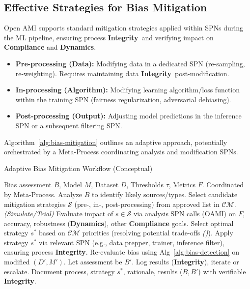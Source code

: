 \documentclass[12pt,a4paper]{report}
\renewcommand{\citep}[1]{\textit{\scriptsize{(\cite{#1})}}}
\newcommand{\Integrity}{\textbf{Integrity}}
\newcommand{\Dynamics}{\textbf{Dynamics}}
\begin{document}
	\subsection{Effective Strategies for Bias Mitigation} %
	\label{sec:5-4-3} %
	
	Open AMI supports standard mitigation strategies applied within SPNs during the ML pipeline, ensuring process \Integrity\ and verifying impact on \textbf{Compliance} and \Dynamics.
	\begin{itemize}
		\item \textbf{Pre-processing (Data):} Modifying data in a dedicated SPN (re-sampling, re-weighting). Requires maintaining data \Integrity\ post-modification.
		\item \textbf{In-processing (Algorithm):} Modifying learning algorithm/loss function within the training SPN (fairness regularization, adversarial debiasing).
		\item \textbf{Post-processing (Output):} Adjusting model predictions in the inference SPN or a subsequent filtering SPN.
	\end{itemize}
	Algorithm~\ref{alg:bias-mitigation} outlines an adaptive approach, potentially orchestrated by a Meta-Process coordinating analysis and modification SPNs.
	
	\begin{algorithm}[H]
		\caption{Adaptive Bias Mitigation Workflow (Conceptual)}
		\label{alg:bias-mitigation}
		\begin{algorithmic}[1]
			\Require Bias assessment $B$, Model $M$, Dataset $D$, Thresholds $\tau$, Metrics $F$. Coordinated by Meta-Process.
			\State Analyze $B$ to identify likely sources/types.
			\State Select candidate mitigation strategies $\mathcal{S}$ (pre-, in-, post-processing) from approved list in $\mathcal{CM}$.
			\State \textit{(Simulate/Trial)} Evaluate impact of $s \in \mathcal{S}$ via analysis SPN calls (OAMI) on $F$, accuracy, robustness (\Dynamics), other \textbf{Compliance} goals.
			\State Select optimal strategy $s^*$ based on $\mathcal{CM}$ priorities (resolving potential trade-offs \citep{Sekrst2024Guardrails}).
			\State Apply strategy $s^*$ via relevant SPN (e.g., data prepper, trainer, inference filter), ensuring process \Integrity.
			\State Re-evaluate bias using Alg~\ref{alg:bias-detection} on modified $(D', M')$. Let assessment be $B'$.
			 \State Log results (\Integrity), iterate or escalate. \EndIf
			\State Document process, strategy $s^*$, rationale, results ($B, B'$) with verifiable \Integrity.
		\end{algorithmic}
	\end{algorithm}
	
\end{document}
